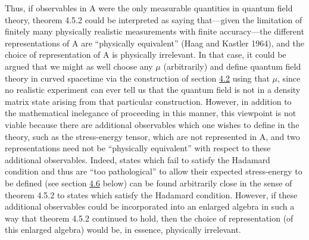 \documentclass[11pt,a4paper]{article}
\begin{document}
Thus, if observables in A were the only measurable quantities in quantum field theory, theorem 4.5.2 could be interpreted as saying that---given the limitation of finitely many physically realistic measurements with finite accuracy---the different representations of A are ``physically equivalent'' (Haag and Kastler 1964), and the choice of representation of A is physically irrelevant. In that case, it could be argued that we might as well choose any \(\mu\) (arbitrarily) and define quantum field theory in curved spacetime via the construction of section \hyperlink{sec:4.2}{4.2} using that \(\mu\), since no realistic experiment can ever tell us that the quantum field is not in a density matrix state arising from that particular construction. However, in addition to the mathematical inelegance of proceeding in this manner, this viewpoint is not viable because there are additional observables which one wishes to define in the theory, such as the stress-energy tensor, which are not represented in A, and two representations need not be ``physically equivalent'' with respect to these additional observables. Indeed, states which fail to satisfy the Hadamard condition and thus are ``too pathological'' to allow their expected stress-energy to be defined (see section \hyperlink{sec:4.6}{4.6} below) can be found arbitrarily close in the sense of theorem 4.5.2 to states which \hypertarget{source-96}{}satisfy the Hadamard condition. However, if these additional observables could be incorporated into an enlarged algebra in such a way that theorem 4.5.2 continued to hold, then the choice of representation (of this enlarged algebra) would be, in essence, physically irrelevant.
\end{document}
